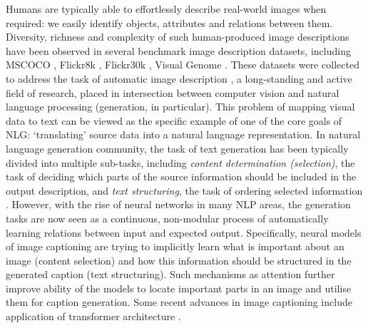 \documentclass[11pt,a4paper]{article}
\begin{document}


\iffalse
Humans are typically able to effortlessly describe real-world images when required: we easily identify objects, attributes and relations between them.
Diversity, richness and complexity of such human-produced image descriptions have been observed in several benchmark image description datasets, including MSCOCO \cite{lin2014microsoft,chen2015microsoft}, Flickr8k \cite{hodosh2013}, Flickr30k \cite{young-etal-2014-image}, Visual Genome \cite{krishnavisualgenome}.
These datasets were collected to address the task of automatic image description \cite{bernardi2016automatic}, a long-standing and active field of research, placed in intersection between computer vision and natural language processing (generation, in particular).
This problem of mapping visual data to text can be viewed as the specific example of one of the core goals of NLG: `translating' source data into a natural language representation.
In natural language generation community, the task of text generation has been typically divided into multiple sub-tasks, including \textit{content determination (selection)}, the task of deciding which parts of the source information should be included in the output description, and \textit{text structuring}, the task of ordering selected information \cite{Gatt2017}.
However, with the rise of neural networks in many NLP areas, the generation tasks are now seen as a continuous, non-modular process of automatically learning relations between input and expected output. Specifically, neural models of image captioning \cite{kiros14,vinyals2014tell} are trying to implicitly learn what is important about an image (content selection) and how this information should be structured in the generated caption (text structuring).
Such mechanisms as attention \cite{xu2015attend,anderson2017bottomup} further improve ability of the models to locate important parts in an image and utilise them for caption generation. Some recent advances in image captioning include application of transformer architecture \cite{vaswani2017attention,herdade2019image}.

\end{document}
